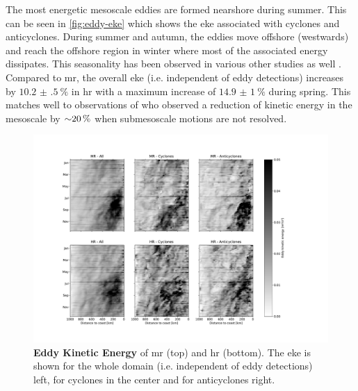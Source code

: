 The most energetic mesoscale eddies are formed nearshore during summer. This can be seen in \autoref{fig:eddy-eke} which shows the \ac{eke} associated with cyclones and anticyclones. During summer and autumn, the eddies move offshore (westwards) and reach the offshore region in winter where most of the associated energy dissipates. This seasonality has been observed in various other studies as well \autocite{kelly-1998-eke-obs, checkley-2009-currentstructure-calcs, chaigneau-2009-four-major-ebus, kurian-2011-eddy-props}. Compared to \ac{mr}, the overall \ac{eke} (i.e. independent of eddy detections) increases by $\SI{10.2(5)}{\percent}$ in \ac{hr} with a maximum increase of $\SI{14.9(10)}{\percent}$ during spring. This matches well to observations of \textcite{schubert-2020-subm-energy-cascade} who observed a reduction of kinetic energy in the mesoscale by ${\sim} \SI{20}{\percent}$ when submesoscale motions are not resolved.\\
\begin{figure}
    \centering
    \includegraphics[width=24cm, trim=0 0 0 2cm]{../figures/result_eddies_eke.pdf}
    \vspace*{-2.0cm}\caption[Eddy Kinetic Energy]{\textbf{Eddy Kinetic Energy} of \ac{mr} (top) and \ac{hr} (bottom). The \ac{eke} is shown for the whole domain (i.e. independent of eddy detections) left, for cyclones in the center and for anticyclones right.}
    \label{fig:eddy-eke}
\end{figure}
\\
